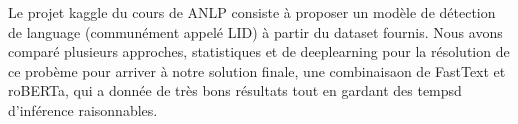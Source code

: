 \noindent Le projet kaggle \cite{NLP-CS-25} du cours de ANLP consiste à proposer un modèle de détection de language (communément appelé LID) à partir du dataset fournis. Nous avons comparé plusieurs approches, statistiques et de deeplearning pour la résolution de ce probème pour arriver à notre solution finale, une combinaisaon de FastText et roBERTa, qui a donnée de très bons résultats tout en gardant des tempsd d'inférence raisonnables.